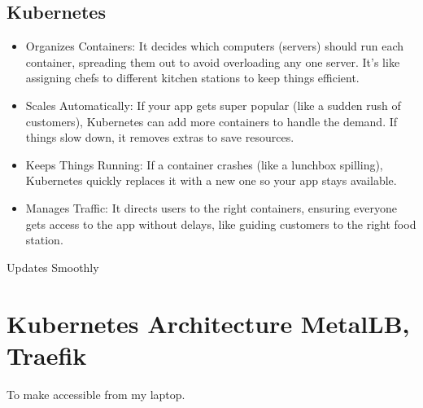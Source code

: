 \documentclass[letterpaper,10pt,english]{sphinxmanual}
\begin{document}
\section{Kubernetes}
\label{\detokenize{intro:kubernetes}}\begin{itemize}
\item {} 
\sphinxAtStartPar
Organizes Containers: It decides which computers (servers) should run each container, spreading them out to avoid overloading any one server. It’s like assigning chefs to different kitchen stations to keep things efficient.

\item {} 
\sphinxAtStartPar
Scales Automatically: If your app gets super popular (like a sudden rush of customers), Kubernetes can add more containers to handle the demand. If things slow down, it removes extras to save resources.

\item {} 
\sphinxAtStartPar
Keeps Things Running: If a container crashes (like a lunchbox spilling), Kubernetes quickly replaces it with a new one so your app stays available.

\item {} 
\sphinxAtStartPar
Manages Traffic: It directs users to the right containers, ensuring everyone gets access to the app without delays, like guiding customers to the right food station.

\end{itemize}

\sphinxAtStartPar
Updates Smoothly

\sphinxstepscope


\chapter{Kubernetes Architecture  MetalLB, Traefik}
\label{\detokenize{setup:kubernetes-architecture-metallb-traefik}}\label{\detokenize{setup:kubernetes-architecture}}\label{\detokenize{setup::doc}}
\sphinxAtStartPar
To make  accessible from my laptop.
\end{document}
